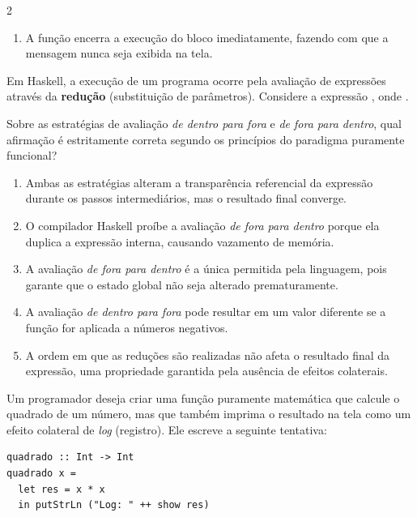 \documentclass[a4paper,10pt,brazil]{article}
\begin{document}
\begin{multicols}{2}
\begin{enumerate}
  \item A função  encerra a execução do bloco  imediatamente, fazendo com que a mensagem  nunca seja exibida na tela.


\end{enumerate}

Em Haskell, a execução de um programa ocorre pela avaliação de expressões através da \textbf{redução} (substituição de parâmetros). Considere a expressão , onde . 

Sobre as estratégias de avaliação \emph{de dentro para fora} e \emph{de fora para dentro}, qual afirmação é estritamente correta segundo os princípios do paradigma puramente funcional?

\begin{enumerate}
  \item Ambas as estratégias alteram a transparência referencial da expressão durante os passos intermediários, mas o resultado final converge.

  \item O compilador Haskell proíbe a avaliação \emph{de fora para dentro} porque ela duplica a expressão interna, causando vazamento de memória.

  \item A avaliação \emph{de fora para dentro} é a única permitida pela linguagem, pois garante que o estado global não seja alterado prematuramente.

  \item A avaliação \emph{de dentro para fora} pode resultar em um valor diferente se a função  for aplicada a números negativos.

  \item A ordem em que as reduções são realizadas não afeta o resultado final da expressão, uma propriedade garantida pela ausência de efeitos colaterais.


\end{enumerate}

Um programador deseja criar uma função puramente matemática que calcule o quadrado de um número, mas que também imprima o resultado na tela como um efeito colateral de \emph{log} (registro). Ele escreve a seguinte tentativa:

\begin{verbatim}
quadrado :: Int -> Int
quadrado x = 
  let res = x * x
  in putStrLn ("Log: " ++ show res)
\end{verbatim}


\end{multicols}
\end{document}
